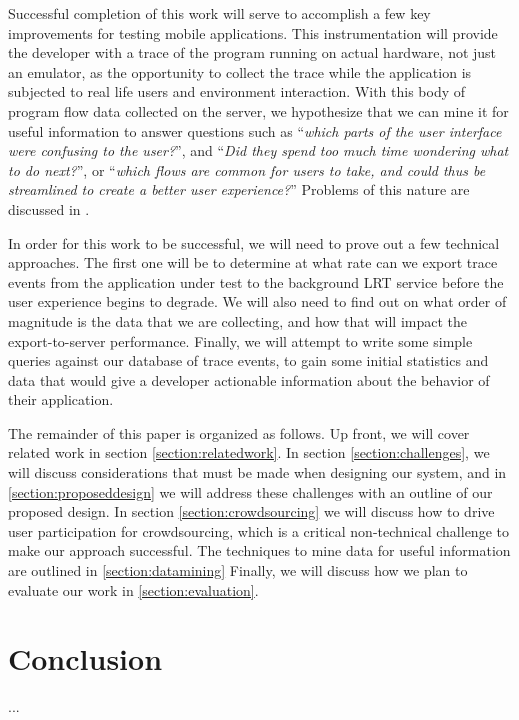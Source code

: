 \documentclass{acm_proc_article-sp}
\begin{document}
Successful completion of this work will serve to accomplish a few key 
improvements for testing mobile applications. This instrumentation will provide 
the developer with a trace of the program running on actual hardware, not just 
an emulator, as the opportunity to collect the trace while the application is 
subjected to real life users and environment interaction. With this 
body of program flow data collected on the server, we hypothesize that we can mine it for useful 
information to answer questions such as ``\emph{which parts of the user interface were 
confusing to the user?}'', and ``\emph{Did they spend too much time wondering what to do 
next?}'', or ``\emph{which flows are common for users to take, and could thus be 
streamlined to create a better user experience?}'' Problems of this nature are 
discussed in \cite{WebAntiPattern}.

In order for this work to be successful, we will need to 
prove out a few technical approaches. The first one will be to determine at what rate can we
export trace events from the application under test to the background LRT service 
before the user experience begins to degrade. 
We will also need to find out on what order of magnitude is the data
that we are collecting, and how that will impact the export-to-server performance.
Finally, we will attempt to write some simple queries against our database of
trace events, to gain some initial statistics and data that would give a developer
actionable information about the behavior of their application.

The remainder of this paper is organized as follows. Up front, we will cover 
related work in section \ref{section:relatedwork}. In section \ref{section:challenges},
we will discuss considerations that must be made when designing our system, and in 
\ref{section:proposeddesign} we will address these challenges with an outline of
our proposed design. In section \ref{section:crowdsourcing} we will discuss how to drive
user participation for crowdsourcing, which is a critical non-technical 
challenge to make our approach successful. The techniques to mine data for useful 
information are outlined in \ref{section:datamining}
Finally, we will discuss how we plan to evaluate our work in \ref{section:evaluation}.








\section{Conclusion}
...

{}

\end{document}
